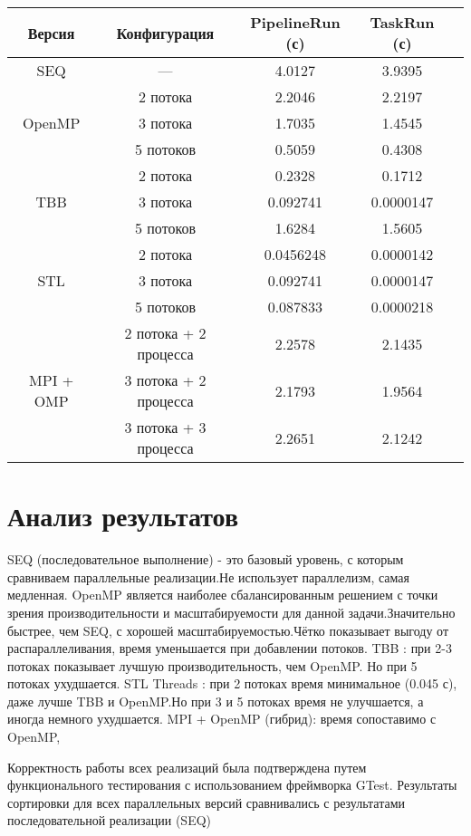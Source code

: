 \documentclass[12pt]{article}
\begin{document}
\begin{center}
\begin{tabular}{|c|c|c|c|c|}
\hline
\textbf{Версия} & \textbf{Конфигурация} & \textbf{PipelineRun (с)} & \textbf{TaskRun (с)} \\
\hline
SEQ & — & 4.0127 & 3.9395\\
\hline
\multirow{3}{*}{OpenMP} 
 & 2 потока & 2.2046 & 2.2197\\
 & 3 потока & 1.7035 & 1.4545\\
 & 5 потоков & 0.5059 & 0.4308\\
\hline
\multirow{3}{*}{TBB} 
 & 2 потока & 0.2328 & 0.1712\\
 & 3 потока & 0.092741 & 0.0000147\\
 & 5 потоков & 1.6284 & 1.5605\\
\hline
\multirow{3}{*}{STL} 
 & 2 потока & 0.0456248 & 0.0000142\\
 & 3 потока & 0.092741 & 0.0000147\\
 & 5 потоков & 0.087833 & 0.0000218\\
\hline
\multirow{5}{*}{MPI + OMP} 
 & 2 потока + 2 процесса & 2.2578 & 2.1435\\
 & 3 потока + 2 процесса & 2.1793 & 1.9564\\
 & 3 потока + 3 процесса & 2.2651 & 2.1242 \\
\hline
\end{tabular}
\end{center}

\section*{Анализ результатов}

SEQ (последовательное выполнение) - это базовый уровень, с которым сравниваем параллельные реализации.Не использует параллелизм, самая медленная.
OpenMP является наиболее сбалансированным решением с точки зрения производительности и масштабируемости для данной задачи.Значительно быстрее, чем SEQ, с хорошей масштабируемостью.Чётко показывает выгоду от распараллеливания, время уменьшается при добавлении потоков.
TBB : при 2-3 потоках показывает лучшую производительность, чем OpenMP. Но при 5 потоках  ухудшается.
STL Threads  : при 2 потоках время минимальное (0.045 с), даже лучше TBB и OpenMP.Но при 3 и 5 потоках время не улучшается, а иногда немного ухудшается.
MPI + OpenMP (гибрид): время сопоставимо с OpenMP, 

Корректность работы всех реализаций была подтверждена путем функционального тестирования с использованием фреймворка GTest. Результаты сортировки для всех параллельных версий сравнивались с результатами последовательной реализации (SEQ)
\end{document}
